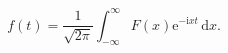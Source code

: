 \[f(t)=\frac{1}{\sqrt{2\pi}}\int^{\infty}_{-\infty}F(x){\mathrm{e}}^{-\mathrm{i}%
xt}\,\mathrm{d}x.\]